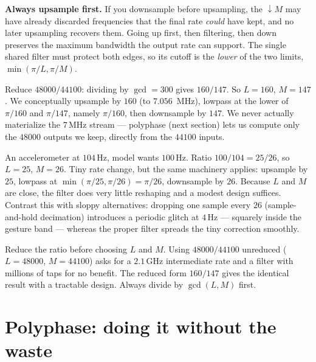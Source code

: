 \begin{focusbox}
\textbf{Always upsample first.} If you downsample before upsampling, the
$\downarrow M$ may have already discarded frequencies that the final rate
\emph{could} have kept, and no later upsampling recovers them. Going up first,
then filtering, then down preserves the maximum bandwidth the output rate can
support. The single shared filter must protect both edges, so its cutoff is the
\emph{lower} of the two limits, $\min(\pi/L, \pi/M)$.
\end{focusbox}

\begin{example}
\label{ch22:ex-audio}
Reduce $48000/44100$: dividing by $\gcd = 300$ gives $160/147$. So $L=160$,
$M=147$. We conceptually upsample by $160$ (to $7.056$~MHz), lowpass at the
lower of $\pi/160$ and $\pi/147$, namely $\pi/160$, then downsample by $147$. We
never actually materialize the $7$\,MHz stream --- polyphase (next section) lets
us compute only the $48000$ outputs we keep, directly from the $44100$ inputs.
\end{example}

\begin{example}
\label{ch22:ex-imu2}
An accelerometer at $104$\,Hz, model wants $100$\,Hz. Ratio $100/104 = 25/26$, so
$L=25$, $M=26$. Tiny rate change, but the same machinery applies: upsample by
$25$, lowpass at $\min(\pi/25,\pi/26)=\pi/26$, downsample by $26$. Because $L$ and
$M$ are close, the filter does very little reshaping and a modest design suffices.
Contrast this with sloppy alternatives: dropping one sample every $26$
(sample-and-hold decimation) introduces a periodic glitch at $4$\,Hz --- squarely
inside the gesture band --- whereas the proper filter spreads the tiny correction
smoothly.
\end{example}

\begin{trapbox}
Reduce the ratio before choosing $L$ and $M$. Using $48000/44100$ unreduced
($L=48000$, $M=44100$) asks for a $2.1$\,GHz intermediate rate and a filter with
millions of taps for no benefit. The reduced form $160/147$ gives the identical
result with a tractable design. Always divide by $\gcd(L,M)$ first.
\end{trapbox}

\section{Polyphase: doing it without the waste}
\label{ch22:polyphase}


